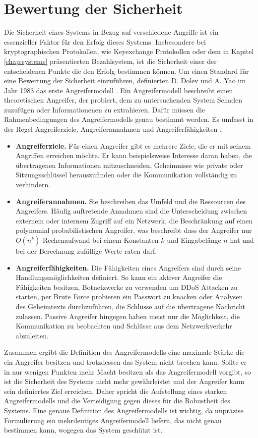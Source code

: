\documentclass[
	fontsize=12pt,
	headings=small,
	parskip=half,           %
	bibliography=totoc,
	numbers=noenddot,       %
	open=any,               %
]{scrreprt}
\begin{document}
\section{Bewertung der Sicherheit}
\label{sec:auswertungSecurity}
Die Sicherheit eines Systems in Bezug auf verschiedene Angriffe ist ein essenzieller Faktor für den Erfolg dieses Systems. Insbesondere bei kryptographischen Protokollen, wie Keyexchange Protokollen oder dem in Kapitel \ref{chap:systems} präsentierten Bezahlsystem, ist die Sicherheit einer der entscheidenen Punkte die den Erfolg bestimmen können. Um einen Standard für eine Bewertung der Sicherheit einzuführen, definierten D. Dolev und A. Yao im Jahr 1983 das erste Angreifermodell \cite{am-dolev1983security}. Ein Angreifermodell beschreibt einen theoretischen Angreifer, der probiert, dem zu untersuchenden System Schaden zuzufügen oder Informationenen zu extrahieren. Dafür müssen die Rahmenbedingungen des Angreifermodells genau bestimmt werden. Es umfasst in der Regel Angreiferziele, Angreiferannahmen und Angreiferfähigkeiten \cite{am-do2019role}. 
\begin{itemize}
    \item \textbf{Angreiferziele.} Für einen Angreifer gibt es mehrere Ziele, die er mit seinem Angriffen erreichen möchte. Er kann beispielsweise Interesse daran haben, die übertragenen Informationen mitzuschneiden, Geheimnisse wie private oder Sitzungsschlüssel herauszufinden oder die Kommunikation vollständig zu verhindern. 
    \item \textbf{Angreiferannahmen.} Sie beschreiben das Umfeld und die Ressourcen des Angreifers. Häufig auftretende Annahmen sind die Unterscheidung zwischen externem oder internem Zugriff auf ein Netzwerk, die Beschränkung auf einen polynomial probabilistischen Angreifer, was beschreibt dass der Angreifer nur $O(n^k)$ Rechenaufwand bei einem Konstanten $k$ und Eingabelänge $n$ hat und bei der Berechnung zufällige Werte raten darf.
    \item \textbf{Angreiferfähigkeiten.} Die Fähigkeiten eines Angreifers sind durch seine Handlungsmöglichkeiten definiert. So kann ein aktiver Angreifer die Fähigkeiten besitzen, Botnetzwerke zu verwenden um DDoS Attacken zu starten, per Brute Force probieren ein Passwort zu knacken oder Analysen des Geheimtexts durchzuführen, die Schlüsse auf die übertragene Nachricht zulassen. Passive Angreifer hingegen haben meist nur die Möglichkeit, die Kommunikation zu beobachten und Schlüsse aus dem Netzwerkverkehr abzuleiten.
\end{itemize} 
Zusammen ergibt die Definition des Angreifermodells eine maximale Stärke die ein Angreifer besitzen und trotzdessen das System nicht brechen kann. Sollte er in nur wenigen Punkten mehr Macht besitzen als das Angreifermodell vorgibt, so ist die Sicherheit des Systems nicht mehr gewährleistet und der Angreifer kann sein definiertes Ziel erreichen. Daher spricht die Aufstellung eines starken Angreifermodells und die Verteidigung gegen dieses für die Robustheit des Systems. Eine genaue Definition des Angreifermodells ist wichtig, da unpräzise Formulierung ein mehrdeutiges Angreifermodell liefern, das nicht genau bestimmen kann, wogegen das System geschützt ist.
\end{document}
